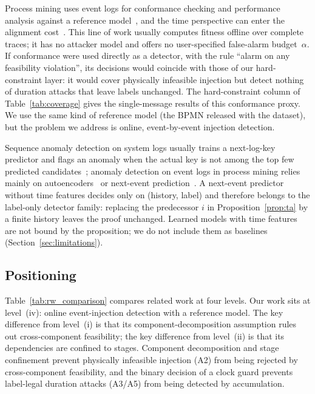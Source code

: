 \documentclass[manuscript,screen,review]{acmart}
\begin{document}
Process mining uses event logs for conformance checking and performance analysis against a reference model~\cite{aalst2012replay,adriansyah2011conformance}, and the time perspective can enter the alignment cost~\cite{rino2024timed}. This line of work usually computes fitness offline over complete traces; it has no attacker model and offers no user-specified false-alarm budget~$\alpha$. If conformance were used directly as a detector, with the rule ``alarm on any feasibility violation'', its decisions would coincide with those of our hard-constraint layer: it would cover physically infeasible injection but detect nothing of duration attacks that leave labels unchanged. The hard-constraint column of Table~\ref{tab:coverage} gives the single-message results of this conformance proxy. We use the same kind of reference model (the {BPMN} released with the dataset), but the problem we address is online, event-by-event injection detection.

Sequence anomaly detection on system logs usually trains a next-log-key predictor and flags an anomaly when the actual key is not among the top few predicted candidates~\cite{du2017deeplog,meng2019loganomaly,landauer2023deep}; anomaly detection on event logs in process mining relies mainly on autoencoders~\cite{nolle2018analyzing} or next-event prediction~\cite{nolle2022binet}.
A next-event predictor without time features decides only on (history, label) and therefore belongs to the label-only detector family: replacing the predecessor $i$ in Proposition~\ref{prop:ta} by a finite history leaves the proof unchanged. Learned models with time features are not bound by the proposition; we do not include them as baselines (Section~\ref{sec:limitations}).

\subsection{Positioning}
\label{sec:rw_position}

Table~\ref{tab:rw_comparison} compares related work at four levels. Our work sits at level~(iv): online event-injection detection with a reference model. The key difference from level~(i) is that its component-decomposition assumption rules out cross-component feasibility; the key difference from level~(ii) is that its dependencies are confined to stages. Component decomposition and stage confinement prevent physically infeasible injection ({A2}) from being rejected by cross-component feasibility, and the binary decision of a clock guard prevents label-legal duration attacks ({A3}/{A5}) from being detected by accumulation.
\end{document}
